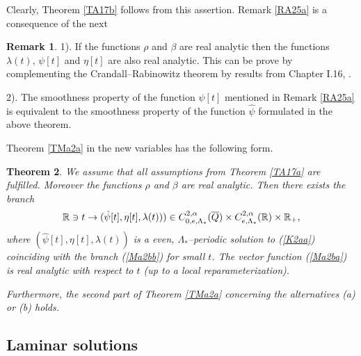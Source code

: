 \documentclass[a4paper,reqno,12pt]{amsart}
\theoremstyle{plain}
\newtheorem{theorem}{Theorem}[section]
\theoremstyle{definition}
\newtheorem{remark}[theorem]{Remark}
\numberwithin{equation}{section}
\begin{document}
Clearly, Theorem \ref{TA17b} follows from this assertion.
Remark \ref{RA25a} is a consequence of the next
\begin{remark}\label{RA25az}
1). If the functions $\rho$ and $\beta$ are real analytic then the functions $\lambda(t)$, $\psi[t]$ and $\eta[t]$ are also real analytic. This can be prove by complementing
the Crandall--Rabinowitz theorem by results from Chapter I.16, \cite{Ki1}.

2). The smoothness property of the function $\psi[t]$ mentioned in Remark \ref{RA25a} is equivalent to the smoothness property of the function $\widehat{\psi}$ formulated in the above theorem.
\end{remark}

Theorem \ref{TMa2a} in the new variables has the following form.

\begin{theorem}\label{TMa2b} We assume that all assumptions from Theorem \ref{TA17a} are fulfilled. Moreover the functions $\rho$ and $\beta$ are real analytic. Then there exists the branch
\begin{equation}\label{Ma2ba}
\Bbb R\ni t\rightarrow (\hat{\psi}[t],\eta[t],\lambda(t)))\in C^{2,\alpha}_{0,e,\Lambda_*}(\overline{Q})\times C^{2,\alpha}_{e,\Lambda_*}(\Bbb R)\times\Bbb R_+,
\end{equation}
where $(\hat{\psi}[t],\eta[t],\lambda(t))$ is a even, $\Lambda_*$--periodic solution to (\ref{K2aa})  coinciding with the branch (\ref{Ma2bb}) for small $t$. The vector function (\ref{Ma2ba}) is real analytic with respect to $t$ (up to a local reparameterization).

Furthermore, the second part of Theorem \ref{TMa2a} concerning the alternatives (a) or (b) holds.



\end{theorem}



\subsection{Laminar solutions}
\end{document}
